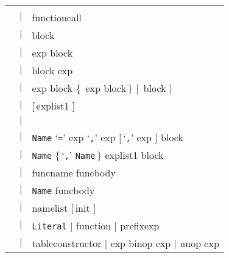 \documentclass[11pt,twoside]{article}
\renewcommand{\Or}{$|$ }
\renewcommand{\rep}[1]{{\rm\{}\,#1\,{\rm\}}}
\renewcommand{\opt}[1]{{\rm [}\,#1\,{\,\rm]}}
\renewcommand{\ter}[1]{{\rm`{\tt#1}'}}
\newcommand{\Nter}[1]{{\tt#1}}
\begin{document}
\renewenvironment{Produc}{\vspace{0.8ex}\par\noindent\hspace{3ex}\it\begin{tabular}{rrl}}{\end{tabular}\vspace{0.8ex}\par\noindent}

\renewcommand{\OrNL}{\\ & \Or & }


\begin{Produc}

\produc{chunk}{\rep{stat \opt{\ter{;}}}}

\produc{block}{chunk}

\produc{stat}{%
	varlist1 \ter{=} explist1
\OrNL	functioncall
\OrNL	\rwd{do} block \rwd{end}
\OrNL	\rwd{while} exp \rwd{do} block \rwd{end}
\OrNL	\rwd{repeat} block \rwd{until} exp
\OrNL	\rwd{if} exp \rwd{then} block
	\rep{\rwd{elseif} exp \rwd{then} block}
	\opt{\rwd{else} block} \rwd{end}
\OrNL	\rwd{return} \opt{explist1}
\OrNL	\rwd{break}
\OrNL	\rwd{for} \Nter{Name} \ter{=} exp \ter{,} exp \opt{\ter{,} exp}
	\rwd{do} block \rwd{end}
\OrNL   \rwd{for} \Nter{Name} \rep{\ter{,} \Nter{Name}} \rwd{in} explist1
                    \rwd{do} block \rwd{end}
\OrNL	\rwd{function} funcname funcbody
\OrNL	\rwd{local} \rwd{function} \Nter{Name} funcbody
\OrNL	\rwd{local} namelist \opt{init}
}

\produc{funcname}{\Nter{Name} \rep{\ter{.} \Nter{Name}}
                              \opt{\ter{:} \Nter{Name}}}

\produc{varlist1}{var \rep{\ter{,} var}}

\produc{var}{%
	\Nter{Name}
\Or	prefixexp \ter{[} exp \ter{]}
\Or	prefixexp \ter{.} \Nter{Name}
}

\produc{namelist}{\Nter{Name} \rep{\ter{,} \Nter{Name}}}

\produc{init}{\ter{=} explist1}

\produc{explist1}{\rep{exp \ter{,}} exp}

\produc{exp}{%
	\rwd{nil}
	\rwd{false}
	\rwd{true}
\Or	\Nter{Number}
\OrNL	\Nter{Literal}
\Or	function
\Or	prefixexp
\OrNL	tableconstructor
\Or	exp binop exp
\Or	unop exp
}

\produc{prefixexp}{var \Or functioncall \Or \ter{(} exp \ter{)}}


\end{Produc}
\end{document}
